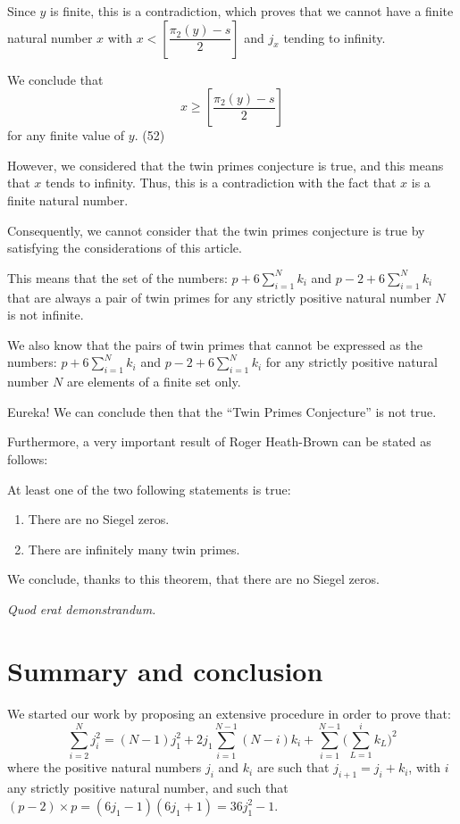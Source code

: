 \documentclass[11pt]{article}
\begin{document}
Since $y$ is finite, this is a contradiction, which proves that we cannot have a finite natural number $x$ with $x < \left[\dfrac{\pi_2(y)-s}{2}\right]$ and $j_x$ tending to infinity.

We conclude that
\begin{equation}
x \geq \left[\frac{\pi_2(y)-s}{2}\right]
\end{equation}
for any finite value of $y$. \hfill (52)

However, we considered that the twin primes conjecture is true, and this means that $x$ tends to infinity. Thus, this is a contradiction with the fact that $x$ is a finite natural number.

Consequently, we cannot consider that the twin primes conjecture is true by satisfying the considerations of this article.

This means that the set of the numbers: $p + 6\sum_{i=1}^{N} k_i$ and $p - 2 + 6\sum_{i=1}^{N} k_i$ that are always a pair of twin primes for any strictly positive natural number $N$ is not infinite.

We also know that the pairs of twin primes that cannot be expressed as the numbers: $p + 6\sum_{i=1}^{N} k_i$ and $p - 2 + 6\sum_{i=1}^{N} k_i$ for any strictly positive natural number $N$ are elements of a finite set only.

Eureka! We can conclude then that the ``Twin Primes Conjecture'' is not true.

Furthermore, a very important result of Roger Heath-Brown \cite{ref6} can be stated as follows:

At least one of the two following statements is true:
\begin{enumerate}[label=\arabic*-, leftmargin=1.5cm]
\item There are no Siegel zeros.
\item There are infinitely many twin primes.
\end{enumerate}

We conclude, thanks to this theorem, that there are no Siegel zeros.

\begin{center}
\textit{Quod erat demonstrandum.}
\end{center}

\section{Summary and conclusion}

We started our work by proposing an extensive procedure in order to prove that:
\begin{equation}
\sum_{i=2}^{N} j_i^2 = (N-1)j_1^2 + 2j_1\sum_{i=1}^{N-1}(N-i)k_i + \sum_{i=1}^{N-1}\Big(\sum_{L=1}^{i}k_L\Big)^2
\end{equation}
where the positive natural numbers $j_i$ and $k_i$ are such that $j_{i+1} = j_i+k_i$, with $i$ any strictly positive natural number, and such that $(p-2)\times p = (6j_1-1)(6j_1+1) = 36 j_1^2 - 1$.
\end{document}
